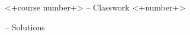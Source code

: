 
\centerline{<+course number+> -- Classwork <+number+>}
\medskip
\centerline{
  \ifprintanswers
    -- Solutions
  \else
  \fi
}
\hrulefill
\bigskip

